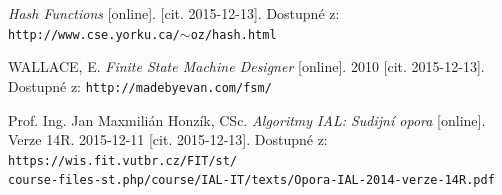 \documentclass[a4paper, 12pt]{article}
\begin{document}
\begin{thebibliography}{2}

\textit{Hash Functions}
[online]. [cit. 2015-12-13]. Dostupné z:\\ \texttt{http://www.cse.yorku.ca/$\sim$oz/hash.html}

WALLACE, E.
\textit{Finite State Machine Designer}
[online]. 2010 [cit. 2015-12-13]. Dostupné z: \texttt{http://madebyevan.com/fsm/}

Prof. Ing. Jan Maxmilián Honzík, CSc.
\textit{Algoritmy IAL: Sudijní opora}
[online]. Verze 14R. 2015-12-11 [cit. 2015-12-13].
Dostupné z: \texttt{https://wis.fit.vutbr.cz/FIT/st/\\course-files-st.php/course/IAL-IT/texts/Opora-IAL-2014-verze-14R.pdf}

 
\end{thebibliography}
\end{document}
